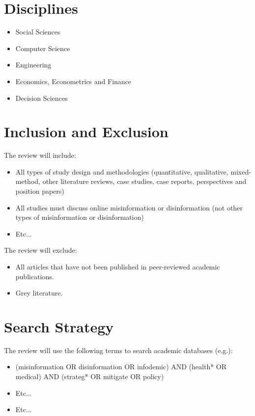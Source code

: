 \documentclass[a4paper,12pt]{article}
\begin{document}
\section*{Disciplines}

\begin{itemize}
    \item Social Sciences
    \item Computer Science
    \item Engineering
    \item Economics, Econometrics and Finance
    \item Decision Sciences
\end{itemize}

\section*{Inclusion and Exclusion}

\par The review will include:

\begin{itemize}
    \item All types of study design and methodologies (quantitative, 
qualitative, mixed-method, other literature reviews, case studies, 
case reports, perspectives and position papers)
    \item All studies must discuss online misinformation or 
disinformation (not other types of misinformation or disinformation)
    \item Etc...
\end{itemize}

\par The review will exclude: 

\begin{itemize}
    \item All articles that have not been published in peer-reviewed 
academic publications.
    \item Grey literature.
\end{itemize}

\section*{Search Strategy}

\par The review will use the following terms to search academic 
databases (e.g.):

\begin{itemize}
    \item (misinformation OR disinformation OR infodemic) AND (health* 
OR medical) AND (strateg* OR mitigate OR policy)
    \item Etc...
    \item Etc...
\end{itemize}
\end{document}
